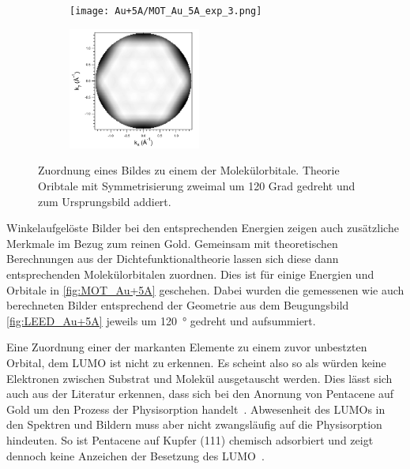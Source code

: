 \begin{figure}
\begin{subfigure}[t]{0.48\textwidth}
                \texttt{[image: Au+5A/MOT\_Au\_5A\_exp\_3.png]}
                \label{fig:MOT_Au+5A_exp_3}
            \end{subfigure}
            \begin{subfigure}[t]{0.48\textwidth}
                \centering
                \includegraphics[height=4cm]{Au+5A/HOMO2_all_CT}
                \label{fig:MOT_Au+5A_theo_3}
            \end{subfigure}
            \caption{Zuordnung eines Bildes zu einem der Molekülorbitale. Theorie Oribtale mit Symmetrisierung zweimal um 120 Grad gedreht und zum Ursprungsbild addiert.}
            \label{fig:MOT_Au+5A}
        \end{figure}
        Winkelaufgelöste Bilder bei den entsprechenden Energien zeigen auch zusätzliche Merkmale im Bezug zum reinen Gold.
        Gemeinsam mit theoretischen Berechnungen aus der Dichtefunktionaltheorie lassen sich diese dann entsprechenden Molekülorbitalen zuordnen.
        Dies ist für einige Energien und Orbitale in \autoref{fig:MOT_Au+5A} geschehen.
        Dabei wurden die gemessenen wie auch berechneten Bilder entsprechend der Geometrie aus dem Beugungsbild \autoref{fig:LEED_Au+5A} jeweils um \SI{120}{\degree} gedreht und aufsummiert.

        Eine Zuordnung einer der markanten Elemente zu einem zuvor unbestzten Orbital, dem LUMO ist nicht zu erkennen.
        Es scheint also so als würden keine Elektronen zwischen Substrat und Molekül ausgetauscht werden. 
        Dies lässt sich auch aus der Literatur erkennen, dass sich bei den Anornung von Pentacene auf Gold um den Prozess der Physisorption handelt~\cite{5A_4}.
        Abwesenheit des LUMOs in den Spektren und Bildern muss aber nicht zwangsläufig auf die Physisorption hindeuten.
        So ist Pentacene auf Kupfer (111) chemisch adsorbiert und zeigt dennoch keine Anzeichen der Besetzung des LUMO~\cite{koch_adsorption-induced_2008}.
